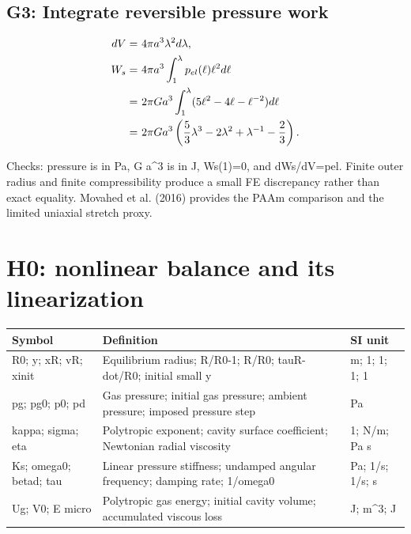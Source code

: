 \documentclass[11pt]{article}
\begin{document}
\subsection{G3: Integrate reversible pressure work}

\begin{align}
dV= & ~4\pi a^3\lambda^2d\lambda, \notag \\
W_s= & ~4\pi a^3\int_1^\lambda p_{el}(\ell)\ell^2d\ell \notag \\
= & ~2\pi Ga^3\int_1^\lambda(5\ell^2-4\ell-\ell^{-2})d\ell \notag \\
= & ~2\pi Ga^3\left(\frac53\lambda^3-2\lambda^2+\lambda^{-1}-\frac23\right). \label{eq:gel_elastic_work}
\end{align}

Checks: pressure is in Pa, G a\textasciicircum{}3 is in J, Ws(1)=0, and dWs/dV=pel. Finite outer radius and finite compressibility produce a small FE discrepancy rather than exact equality. Movahed et al. (2016) provides the PAAm comparison and the limited uniaxial stretch proxy.

\section{H0: nonlinear balance and its linearization}\label{sec:h0}

\begin{longtable}{p{.18\linewidth}p{.60\linewidth}p{.15\linewidth}}Symbol & Definition & SI unit\\\hline

R0; y; xR; vR; xinit & Equilibrium radius; R/R0-1; R/R0; tauR-dot/R0; initial small y & m; 1; 1; 1; 1\\

pg; pg0; p0; pd & Gas pressure; initial gas pressure; ambient pressure; imposed pressure step & Pa\\

kappa; sigma; eta & Polytropic exponent; cavity surface coefficient; Newtonian radial viscosity & 1; N/m; Pa s\\

Ks; omega0; betad; tau & Linear pressure stiffness; undamped angular frequency; damping rate; 1/omega0 & Pa; 1/s; 1/s; s\\

Ug; V0; E micro  & Polytropic gas energy; initial cavity volume; accumulated viscous loss & J; m\textasciicircum{}3; J\\

\end{longtable}
\end{document}
